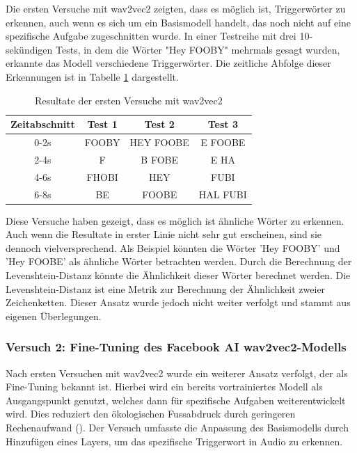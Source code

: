 \documentclass[11pt,a4paper]{article}
\begin{document}
\noindent \newline
Die ersten Versuche mit wav2vec2 zeigten, dass es möglich ist, Triggerwörter zu erkennen, auch 
wenn es sich um ein Basismodell handelt, das noch nicht auf eine spezifische Aufgabe zugeschnitten 
wurde. In einer Testreihe mit drei 10-sekündigen Tests, in dem die Wörter "Hey FOOBY" mehrmals 
gesagt wurden, erkannte das Modell verschiedene Triggerwörter. Die zeitliche Abfolge dieser 
Erkennungen ist in Tabelle \ref{tab:wav2vec2_results} dargestellt.

\begin{table}[H]
	\centering
	\begin{tabular}{|c|c|c|c|}
		\hline
		\textbf{Zeitabschnitt} & \textbf{Test 1} & \textbf{Test 2} & \textbf{Test 3} \\
		\hline
		0-2s & FOOBY & HEY FOOBE & E FOOBE \\
		2-4s & F & B FOBE & E HA \\
		4-6s & FHOBI & HEY & FUBI \\
		6-8s & BE & FOOBE & HAL FUBI\\
		\hline
	\end{tabular}
	\caption{Resultate der ersten Versuche mit wav2vec2}
	\label{tab:wav2vec2_results}
\end{table}

\noindent \newline
Diese Versuche haben gezeigt, dass es möglich ist ähnliche Wörter zu erkennen. Auch wenn die 
Resultate in erster Linie nicht sehr gut erscheinen, sind sie dennoch vielversprechend. Als 
Beispiel könnten die Wörter 'Hey FOOBY' und 'Hey FOOBE' als ähnliche Wörter betrachten werden. 
Durch die Berechnung der Levenshtein-Distanz könnte die Ähnlichkeit dieser Wörter berechnet werden.
Die Levenshtein-Distanz ist eine Metrik zur Berechnung der Ähnlichkeit zweier Zeichenketten. Dieser 
Ansatz wurde jedoch nicht weiter verfolgt und stammt aus eigenen Überlegungen.

\subsubsection{Versuch 2: Fine-Tuning des Facebook AI wav2vec2-Modells}
Nach ersten Versuchen mit wav2vec2 wurde ein weiterer Ansatz verfolgt, der als Fine-Tuning bekannt 
ist. Hierbei wird ein bereits vortrainiertes Modell als Ausgangspunkt genutzt, welches dann für 
spezifische Aufgaben weiterentwickelt wird. Dies reduziert den ökologischen Fussabdruck durch 
geringeren Rechenaufwand (\cite{huggingface2023finetune}). Der Versuch umfasste die Anpassung des 
Basismodells durch Hinzufügen eines Layers, um das spezifische Triggerwort in Audio zu erkennen. 
\end{document}
